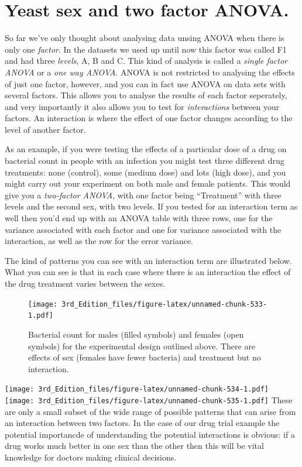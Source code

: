 \documentclass[
]{book}
\begin{document}
\hypertarget{yeast-sex-and-two-factor-anova.}{%
\chapter{Yeast sex and two factor ANOVA.}\label{yeast-sex-and-two-factor-anova.}}

So far we've only thought about analysing data unsing ANOVA when there is only one \emph{factor}. In the datasets we used up until now this factor was called F1 and had three \emph{levels}, A, B and C. This kind of analysis is called a \emph{single factor ANOVA} or a \emph{one way ANOVA}. ANOVA is not restricted to analysing the effects of just one factor, however, and you can in fact use ANOVA on data sets with several factors. This allows you to analyse the results of each factor seperately, and very importantly it also allows you to test for \emph{interactions} between your factors. An interaction is where the effect of one factor changes according to the level of another factor.

As an example, if you were testing the effects of a particular dose of a drug on bacterial count in people with an infection you might test three different drug treatments: none (control), some (medium dose) and lots (high dose), and you might carry out your experiment on both male and female patients. This would give you a \emph{two-factor ANOVA}, with one factor being ``Treatment'' with three levels and the second sex, with two levels. If you tested for an interaction term as well then you'd end up with an ANOVA table with three rows, one for the variance associated with each factor and one for variance associated with the interaction, as well as the row for the error variance.

The kind of patterns you can see with an interaction term are illustrated below. What you can see is that in each case where there is an interaction the effect of the drug treatment varies between the sexes.

\begin{figure}
\centering
\texttt{[image: 3rd\_Edition\_files/figure-latex/unnamed-chunk-533-1.pdf]}
\caption{\label{fig:unnamed-chunk-533}Bacterial count for males (filled symbols) and females (open symbols) for the experimental design outlined above. There are effects of sex (females have fewer bacteria) and treatment but no interaction.}
\end{figure}

\texttt{[image: 3rd\_Edition\_files/figure-latex/unnamed-chunk-534-1.pdf]}
\texttt{[image: 3rd\_Edition\_files/figure-latex/unnamed-chunk-535-1.pdf]}
These are only a small subset of the wide range of possible patterns that can arise from an interaction between two factors. In the case of our drug trial example the potential importancde of understanding the potential interactions is obvious: if a drug works much better in one sex than the other then this will be vital knowledge for doctors making clinical decisions.
\end{document}
